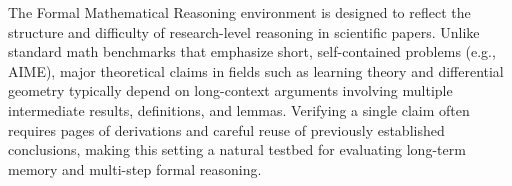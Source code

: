 

The Formal Mathematical Reasoning environment is designed to reflect the structure and difficulty of research-level reasoning in scientific papers. Unlike standard math benchmarks that emphasize short, self-contained problems (e.g., AIME), major theoretical claims in fields such as learning theory and differential geometry typically depend on long-context arguments involving multiple intermediate results, definitions, and lemmas. Verifying a single claim often requires pages of derivations and careful reuse of previously established conclusions, making this setting a natural testbed for evaluating long-term memory and multi-step formal reasoning.

